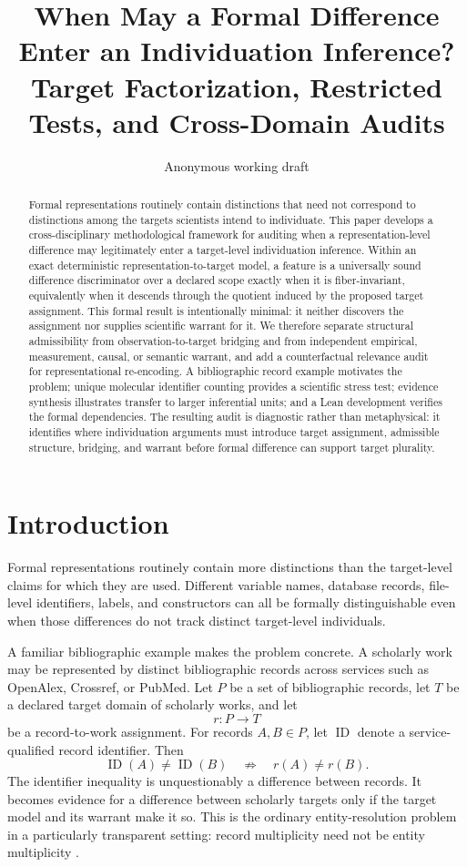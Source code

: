 \documentclass[11pt]{article}
\title{When May a Formal Difference Enter an Individuation Inference?\\
\large Target Factorization, Restricted Tests, and Cross-Domain Audits}
\author{Anonymous working draft}
\date{}
\begin{document}
\maketitle

\begin{abstract}

Formal representations routinely contain distinctions that need not correspond to distinctions among the targets scientists intend to individuate. This paper develops a cross-disciplinary methodological framework for auditing when a representation-level difference may legitimately enter a target-level individuation inference. Within an exact deterministic representation-to-target model, a feature is a universally sound difference discriminator over a declared scope exactly when it is fiber-invariant, equivalently when it descends through the quotient induced by the proposed target assignment. This formal result is intentionally minimal: it neither discovers the assignment nor supplies scientific warrant for it. We therefore separate structural admissibility from observation-to-target bridging and from independent empirical, measurement, causal, or semantic warrant, and add a counterfactual relevance audit for representational re-encoding. A bibliographic record example motivates the problem; unique molecular identifier counting provides a scientific stress test; evidence synthesis illustrates transfer to larger inferential units; and a Lean development verifies the formal dependencies. The resulting audit is diagnostic rather than metaphysical: it identifies where individuation arguments must introduce target assignment, admissible structure, bridging, and warrant before formal difference can support target plurality.

\end{abstract}
\section{Introduction}

Formal representations routinely contain more distinctions than the target-level claims for which they are used. Different variable names, database records, file-level identifiers, labels, and constructors can all be formally distinguishable even when those differences do not track distinct target-level individuals.

A familiar bibliographic example makes the problem concrete. A scholarly work may be represented by distinct bibliographic records across services such as OpenAlex, Crossref, or PubMed. Let \(P\) be a set of bibliographic records, let \(T\) be a declared target domain of scholarly works, and let
\[
r:P\to T
\]
be a record-to-work assignment. For records \(A,B\in P\), let \(\operatorname{ID}\) denote a service-qualified record identifier. Then
\[
\operatorname{ID}(A)\neq\operatorname{ID}(B)
\quad\not\Rightarrow\quad
r(A)\neq r(B).
\]
The identifier inequality is unquestionably a difference between records. It becomes evidence for a difference between scholarly targets only if the target model and its warrant make it so. This is the ordinary entity-resolution problem in a particularly transparent setting: record multiplicity need not be entity multiplicity \citep{AleshinGuendelSteorts2024EntityResolution}.
\end{document}
